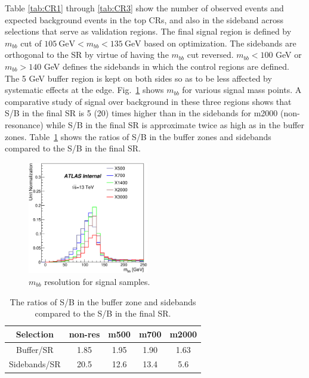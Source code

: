 Table \ref{tab:CR1} through \ref{tab:CR3} show the number of observed
events and expected background events in the top CRs, and also in the sideband across selections that serve as validation regions. The final signal region is defined by $m_{bb}$ cut of $105~\textrm{GeV} < m_{bb} < 135~\textrm{GeV}$ based on optimization. The sidebands are orthogonal to the SR by virtue of having the $m_{bb}$ cut reversed. $m_{bb} < 100$ GeV or $m_{bb} > 140$ GeV defines the sidebands in which the control regions are defined.  The 5 GeV buffer region is kept on both sides so as to be less affected by systematic effects at the edge. Fig.~\ref{fig:mbb_signal} shows $m_{bb}$ for various signal mass points. A comparative study of signal over background in these three regions shows that S/B in the final SR is 5 (20) times higher than in the sidebands for m2000 (non-resonance) while S/B in the final SR is approximate twice as high as in the buffer zones.  Table~\ref{tab:sigOverBkg} shows the ratios of S/B in the buffer zones and sidebands compared to the S/B in the final SR. 

\begin{figure}[!h]
\begin{center}
\includegraphics*[width=0.47\textwidth] {figures/bbMass_X500_X700_X1400_X2000_X3000.eps}
\caption[$m_{bb}$ resolution for signal and sum of backgrounds.]{$m_{bb}$ resolution for signal samples.}
\label{fig:mbb_signal}
\end{center}
\end{figure}

\begin{table}
\begin{center}
\begin{tabular}{c|c|c|c|c|}
Selection & non-res & m500 & m700 & m2000\\
\hline
Buffer/SR              	& 1.85 & 1.95  & 1.90 & 1.63\\
\hline
 Sidebands/SR	       & 20.5 & 12.6 & 13.4 & 5.6\\
\hline 
\end{tabular}
\caption{The ratios of S/B in the buffer zone and sidebands compared to the S/B in the final SR. } 
\label{tab:sigOverBkg}
\end{center}
\end{table}

